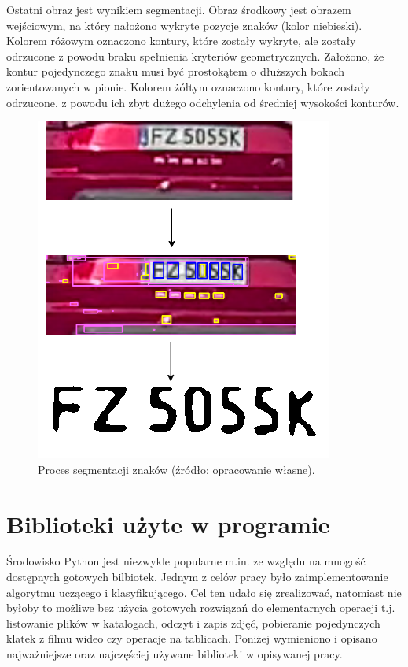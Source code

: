 Ostatni obraz jest wynikiem segmentacji.
Obraz środkowy jest obrazem wejściowym, na który nałożono wykryte pozycje znaków (kolor niebieski).
Kolorem różowym oznaczono kontury, które zostały wykryte, ale zostały odrzucone z powodu braku spełnienia kryteriów geometrycznych.
Założono, że kontur pojedynczego znaku musi być prostokątem \linebreak o dłuższych bokach zorientowanych w pionie.
Kolorem żółtym oznaczono kontury, które zostały odrzucone, z powodu ich zbyt dużego odchylenia od średniej wysokości konturów.
\begin{figure}[!ht]
    \centering
    \includegraphics[scale=0.4]{Pictures/segmentation}
    \caption{Proces segmentacji znaków (źródło: opracowanie własne).}
    \label{fig:segmentation}
\end{figure}
\FloatBarrier


\section{Biblioteki użyte w programie}
Środowisko Python jest niezwykle popularne m.in. ze względu na mnogość dostępnych gotowych bilbiotek.
Jednym z celów pracy było zaimplementowanie algorytmu uczącego i klasyfikującego.
Cel ten udało się zrealizować, natomiast nie byłoby to możliwe bez użycia gotowych rozwiązań do elementarnych operacji t.j. listowanie plików w katalogach, odczyt i zapis zdjęć, pobieranie pojedynczych klatek z filmu wideo czy operacje na tablicach.
Poniżej wymieniono i opisano najważniejsze oraz najczęściej używane biblioteki \linebreak w opisywanej pracy.

